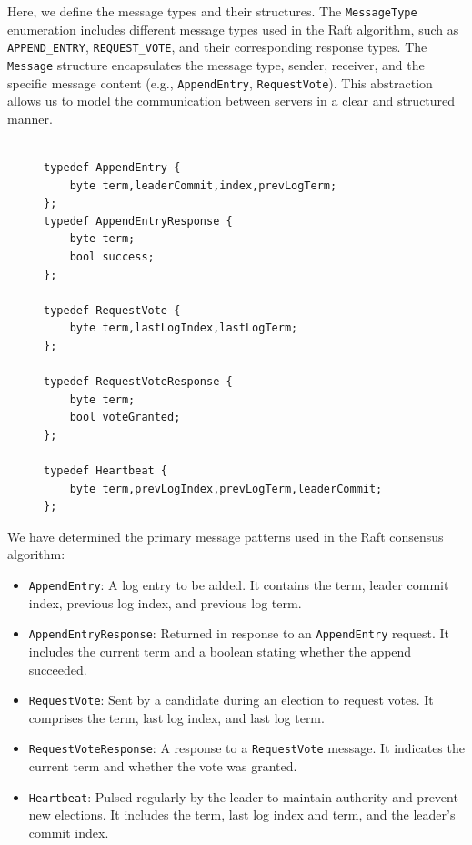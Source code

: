\documentclass[a4paper]{llncs}
\begin{document}
    Here, we define the message types and their structures. The \texttt{MessageType}
    enumeration includes different message types used in the Raft algorithm,
    such as \texttt{APPEND\_ENTRY}, \texttt{REQUEST\_VOTE}, and their
    corresponding response types. The \texttt{Message} structure encapsulates
    the message type, sender, receiver, and the specific message content (e.g.,
    \texttt{AppendEntry}, \texttt{RequestVote}). This abstraction allows us to model
    the communication between servers in a clear and structured manner.

    \begin{figure}[htbp]
        \centering
        \begin{lstlisting}[style=promela, caption={Message Types(2)}]

typedef AppendEntry {
	byte term,leaderCommit,index,prevLogTerm;
};
typedef AppendEntryResponse {
	byte term;
	bool success;
};

typedef RequestVote {
	byte term,lastLogIndex,lastLogTerm;
};

typedef RequestVoteResponse {
	byte term;
	bool voteGranted;
};

typedef Heartbeat {
	byte term,prevLogIndex,prevLogTerm,leaderCommit;
};

\end{lstlisting}
    \end{figure}

    We have determined the primary message patterns used in the Raft consensus algorithm:

\begin{itemize}
  \item \texttt{AppendEntry}: A log entry to be added. It contains the term, leader commit index, previous log index, and previous log term.
  
  \item \texttt{AppendEntryResponse}: Returned in response to an \texttt{AppendEntry} request. It includes the current term and a boolean stating whether the append succeeded.
  
  \item \texttt{RequestVote}: Sent by a candidate during an election to request votes. It comprises the term, last log index, and last log term.
  
  \item \texttt{RequestVoteResponse}: A response to a \texttt{RequestVote} message. It indicates the current term and whether the vote was granted.
  
  \item \texttt{Heartbeat}: Pulsed regularly by the leader to maintain authority and prevent new elections. It includes the term, last log index and term, and the leader's commit index.
\end{itemize}
\end{document}
